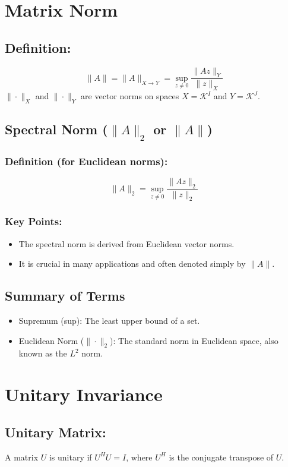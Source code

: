 \documentclass{article}
\begin{document}
\section*{Matrix Norm}

\subsection*{Definition:}
\[
\|A\| = \|A\|_{X \rightarrow Y} = \sup_{z \neq 0} \frac{\|Az\|_Y}{\|z\|_X}
\]
\(\|\cdot\|_X\) and \(\|\cdot\|_Y\) are vector norms on spaces \(X = \mathcal{K}^I\) and \(Y = \mathcal{K}^J\).

\subsection*{Spectral Norm (\(\|A\|_2\) or \(\|A\|\))}
\subsubsection*{Definition (for Euclidean norms):}
\[
\|A\|_2 = \sup_{z \neq 0} \frac{\|Az\|_2}{\|z\|_2}
\]

\subsubsection*{Key Points:}
\begin{itemize}
    \item The spectral norm is derived from Euclidean vector norms.
    \item It is crucial in many applications and often denoted simply by \(\|A\|\).
\end{itemize}

\subsection*{Summary of Terms}
\begin{itemize}
    \item Supremum (sup): The least upper bound of a set.
    \item Euclidean Norm (\(\|\cdot\|_2\)): The standard norm in Euclidean space, also known as the \(L^2\) norm.
\end{itemize}

\section*{Unitary Invariance}
\subsection*{Unitary Matrix:} A matrix \(U\) is unitary if \(U^HU = I\), where \(U^H\) is the conjugate transpose of \(U\).
\end{document}

